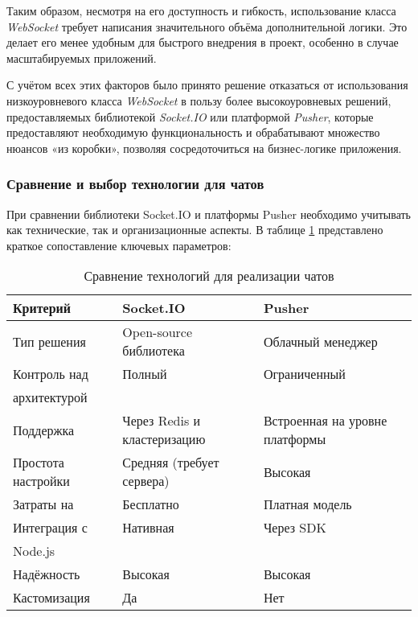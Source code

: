 Таким образом, несмотря на его доступность и гибкость, использование класса \textit{WebSocket} требует написания значительного объёма дополнительной логики. Это делает его менее удобным для быстрого внедрения в проект, особенно в случае масштабируемых приложений.

С учётом всех этих факторов было принято решение отказаться от использования низкоуровневого класса \textit{WebSocket} в пользу более высокоуровневых решений, предоставляемых библиотекой \textit{Socket.IO} или платформой \textit{Pusher}, которые предоставляют необходимую функциональность и обрабатывают множество нюансов «из коробки», позволяя сосредоточиться на бизнес-логике приложения.


\subsubsection*{Сравнение и выбор технологии для чатов}

При сравнении библиотеки Socket.IO и платформы Pusher необходимо учитывать как технические, так и организационные аспекты. В таблице \ref{tab:chat-comparison} представлено краткое сопоставление ключевых параметров:

\begin{table}[h]
  \centering
  \caption{Сравнение технологий для реализации чатов}
  \small
  \label{tab:chat-comparison}
  \begin{tabular}{|l|p{5cm}|p{5cm}|}
  	\hline
  	\textbf{Критерий}  & \textbf{Socket.IO}          & \textbf{Pusher}                \\ \hline
  	Тип решения        & Open-source библиотека      & Облачный менеджер              \\ \hline
  	Контроль над       & Полный                      & Ограниченный                   \\
  	архитектурой       &                             &                                \\ \hline
  	Поддержка          & Через Redis и кластеризацию & Встроенная на уровне платформы \\ \hline
  	Простота настройки & Средняя (требует сервера)   & Высокая                        \\ \hline
  	Затраты на         & Бесплатно                   & Платная модель                 \\ \hline
  	Интеграция с       & Нативная                    & Через SDK                      \\
  	Node.js            &                             &                                \\ \hline
  	Надёжность         & Высокая                     & Высокая                        \\ \hline
  	Кастомизация       & Да                          & Нет                            \\ \hline
  \end{tabular}
\end{table}

